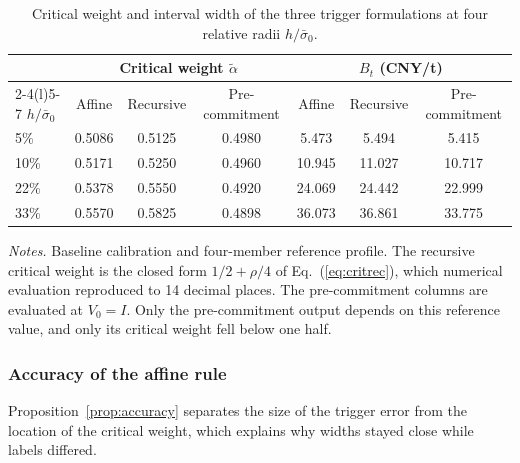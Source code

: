 \documentclass[5p,times,authoryear]{elsarticle}
\theoremstyle{plain}
\newcommand{\sbar}{\bar{\sigma}_0}
\begin{document}
\begin{table}[!t]
\caption{Critical weight and interval width of the three trigger formulations at four relative radii $h/\sbar$.}
\label{tab:threeform}
\centering
\footnotesize
\begin{tabular}{@{}lcccccc@{}}
\toprule
 & \multicolumn{3}{c}{Critical weight $\tilde{\alpha}$} & \multicolumn{3}{c}{$B_t$ (CNY/t)}\\
\cmidrule(lr){2-4}\cmidrule(l){5-7}
$h/\sbar$ & Affine & Recursive & Pre-commitment & Affine & Recursive & Pre-commitment\\
\midrule
5\% & 0.5086 & 0.5125 & 0.4980 & 5.473 & 5.494 & 5.415\\
10\% & 0.5171 & 0.5250 & 0.4960 & 10.945 & 11.027 & 10.717\\
22\% & 0.5378 & 0.5550 & 0.4920 & 24.069 & 24.442 & 22.999\\
33\% & 0.5570 & 0.5825 & 0.4898 & 36.073 & 36.861 & 33.775\\
\bottomrule
\end{tabular}
\par\smallskip
\parbox{0.95\textwidth}{\footnotesize\emph{Notes.} Baseline calibration and four-member reference profile. The recursive critical weight is the closed form $1/2+\rho/4$ of Eq.~(\ref{eq:critrec}), which numerical evaluation reproduced to 14 decimal places. The pre-commitment columns are evaluated at $V_0=I$. Only the pre-commitment output depends on this reference value, and only its critical weight fell below one half.}
\end{table}

\subsubsection{Accuracy of the affine rule}

Proposition~\ref{prop:accuracy} separates the size of the trigger error from the location of the critical weight, which explains why widths stayed close while labels differed.
\end{document}

